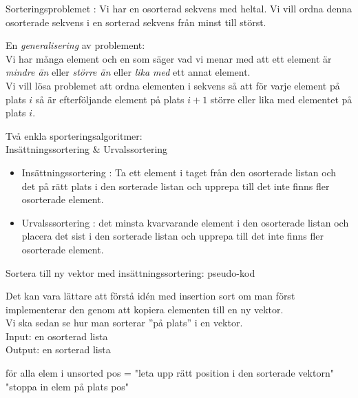 \documentclass{lecturenotes}
\begin{document}
\begin{Slide}{Sorteringsproblemet}
: Vi har en osorterad sekvens med heltal. Vi vill ordna denna osorterade sekvens i en sorterad sekvens från minst till störst.
\pause

\vspace{2em}
En \emph{generalisering} av problement: \\ \vspace{1em} Vi har många element och en  som säger vad vi menar med att ett element är \emph{mindre än} eller \emph{större än} eller \emph{lika med} ett annat element. \\ \vspace{1em}
Vi vill lösa problemet att ordna elementen i sekvens så att för varje element på plats $i$ så är efterföljande element på plats $i + 1$ större eller lika med elementet på plats $i$.

\end{Slide} 

\begin{Slide}{Två enkla sporteringsalgoritmer: \\ Insättningssortering \& Urvalssortering}
\begin{itemize}
\item Insättningssortering : Ta ett element i taget från den osorterade listan och  det på rätt plats i den sorterade listan och upprepa till det inte finns fler osorterade element. 
\pause
\item Urvalsssortering :  det minsta kvarvarande element i den osorterade listan och placera det sist i den sorterade listan och upprepa till det inte finns fler osorterade element. 
\end{itemize}
\end{Slide} 


\begin{Slide}{Sortera till ny vektor med insättningssortering: pseudo-kod}

{\footnotesize Det kan vara lättare att förstå idén med insertion sort om man först implementerar den genom att kopiera elementen till en ny vektor. \\ Vi ska sedan se hur man sorterar ''på plats''  i en  vektor.\\} \vspace{1em}
Input: en osorterad lista  \\
Output: en sorterad lista 
\begin{Code}
för alla elem i unsorted {
   pos = "leta upp rätt position i den sorterade vektorn"
   "stoppa in elem på plats pos" 
}
\end{Code}
\end{Slide}
\end{document}
